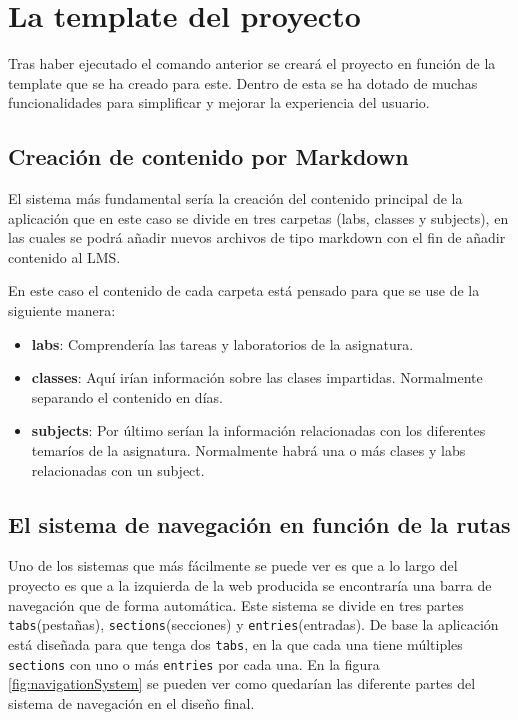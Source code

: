 \section{La template del proyecto}
Tras haber ejecutado el comando anterior se creará el proyecto en función de la template que se ha creado para este. Dentro de esta se ha dotado de muchas funcionalidades para simplificar y mejorar la experiencia del usuario.

\subsection{Creación de contenido por Markdown}
El sistema más fundamental sería la creación del contenido principal de la aplicación que en este caso se divide en tres carpetas (labs, classes y subjects), en las cuales se podrá añadir nuevos archivos de tipo markdown con el fin de añadir contenido al LMS.

En este caso el contenido de cada carpeta está pensado para que se use de la siguiente manera:
\begin{itemize}
    \item \textbf{labs}: Comprendería las tareas y laboratorios de la asignatura.
    \item \textbf{classes}: Aquí irían información sobre las clases impartidas. Normalmente separando el contenido en días.
    \item \textbf{subjects}: Por último serían la información relacionadas con los diferentes temaríos de la asignatura. Normalmente habrá una o más clases y labs relacionadas con un subject.
\end{itemize}

\subsection{El sistema de navegación en función de la rutas}
Uno de los sistemas que más fácilmente se puede ver es que a lo largo del proyecto es que a la izquierda de la web producida se encontraría una barra de navegación que de forma automática. Este sistema se divide en tres partes \verb|tabs|(pestañas), \verb|sections|(secciones) y \verb|entries|(entradas). De base la aplicación está diseñada para que tenga dos \verb|tabs|, en la que cada una tiene múltiples \verb|sections| con uno o más \verb|entries| por cada una. En la figura \ref{fig:navigationSystem} se pueden ver como quedarían las diferente partes del sistema de navegación en el diseño final.

